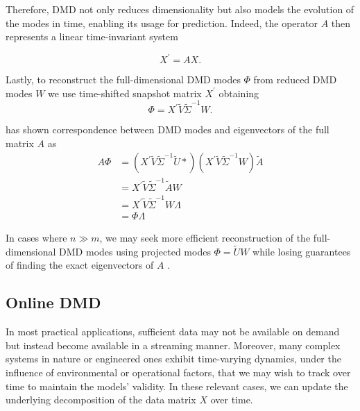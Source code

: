Therefore, DMD not only reduces dimensionality but also models the evolution of the modes in time, enabling its usage for prediction\citep{Brunton2022}. Indeed, the operator \(A\) then represents a linear time-invariant system

\begin{equation*}
    X^\prime = AX.
\end{equation*}

Lastly, to reconstruct the full-dimensional DMD modes \(\Phi \) from reduced DMD modes \(W\) we use time-shifted snapshot matrix \(X^\prime \) obtaining
\begin{equation}\label{eq:full-dmd-modes}
    \Phi = X^\prime \tilde{V} \tilde{\Sigma}^{-1} W.
\end{equation}

\citet{Tu2013} has shown correspondence between DMD modes and eigenvectors of the full matrix \(A\) as
\begin{align*}
    A\Phi
     & = (X^\prime \tilde{V} \tilde{\Sigma}^{-1} \tilde{U}*) (X^\prime \tilde{V} \tilde{\Sigma}^{-1} W)
    \tilde{A}                                                                                           \\
     & = X^\prime \tilde{V} \tilde{\Sigma}^{-1} \tilde{A} W                                             \\
     & = X^\prime \tilde{V} \tilde{\Sigma}^{-1} W \Lambda                                               \\
     & = \Phi \Lambda
\end{align*}

In cases where \(n \gg m\), we may seek more efficient reconstruction of the full-dimensional DMD modes using projected modes \(\Phi = \tilde{U} W\) while losing guarantees of finding the exact eigenvectors of \(A\) \citep{Schmid2010}.

\subsection{Online DMD}
In most practical applications, sufficient data may not be available on demand but instead become available in a streaming manner. Moreover, many complex systems in nature or engineered ones exhibit time-varying dynamics, under the influence of environmental or operational factors, that we may wish to track over time to maintain the models' validity. In these relevant cases, we can update the underlying decomposition of the data matrix \(X\) over time.

